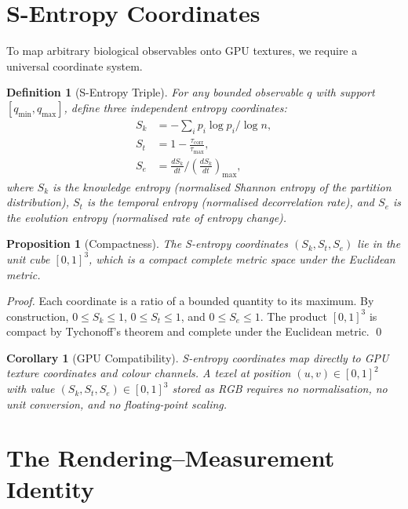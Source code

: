 \documentclass[11pt,twocolumn,a4paper]{article}
\newtheorem{corollary}[theorem]{Corollary}
\newtheorem{proposition}[theorem]{Proposition}
\newtheorem{definition}[theorem]{Definition}
\newcommand{\Sk}{S_k}
\newcommand{\St}{S_t}
\newcommand{\Se}{S_e}
\begin{document}
\section{S-Entropy Coordinates}
\label{sec:s-entropy}

To map arbitrary biological observables onto GPU textures, we require
a universal coordinate system.

\begin{definition}[S-Entropy Triple]
\label{def:s-entropy}
For any bounded observable $q$ with support $[q_{\min}, q_{\max}]$,
define three independent entropy coordinates:
\begin{align}
  \Sk &= -\sum_{i} p_i \log p_i \bigg/ \log n,
    \label{eq:sk} \\
  \St &= 1 - \frac{\tau_{\mathrm{corr}}}{\tau_{\max}},
    \label{eq:st} \\
  \Se &= \frac{d\Sk}{dt} \bigg/ \left(\frac{d\Sk}{dt}\right)_{\max},
    \label{eq:se}
\end{align}
where $\Sk$ is the \emph{knowledge entropy} (normalised Shannon
entropy of the partition distribution), $\St$ is the \emph{temporal
entropy} (normalised decorrelation rate), and $\Se$ is the
\emph{evolution entropy} (normalised rate of entropy change).
\end{definition}

\begin{proposition}[Compactness]
\label{prop:compactness}
The S-entropy coordinates $(\Sk, \St, \Se)$ lie in the unit cube
$[0,1]^3$, which is a compact complete metric space under the
Euclidean metric.
\end{proposition}

\begin{proof}
Each coordinate is a ratio of a bounded quantity to its maximum.  By
construction, $0 \leq \Sk \leq 1$, $0 \leq \St \leq 1$, and
$0 \leq \Se \leq 1$.  The product $[0,1]^3$ is compact by
Tychonoff's theorem and complete under the Euclidean metric.  \qed
\end{proof}

\begin{corollary}[GPU Compatibility]
\label{cor:gpu}
S-entropy coordinates map directly to GPU texture coordinates and
colour channels.  A texel at position $(u, v) \in [0,1]^2$ with value
$(\Sk, \St, \Se) \in [0,1]^3$ stored as RGB requires no
normalisation, no unit conversion, and no floating-point scaling.
\end{corollary}


\section{The Rendering--Measurement Identity}
\label{sec:rendering-measurement}
\end{document}
